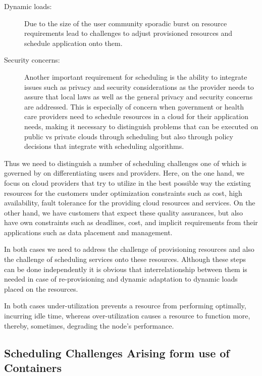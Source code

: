 \documentclass[final,5p,times,twocolumn]{elsarticle}
\begin{document}
\begin{description}
\item[Dynamic loads:] Due to the size of the user community sporadic
  burst on resource requirements lead to challenges to adjust
  provisioned resources and schedule application onto them.

\item[Security concerns:] Another important requirement for scheduling
  is the ability to integrate issues such as privacy and security
  considerations as the provider needs to assure that local laws as
  well as the general privacy and security concerns are addressed.
  This is especially of concern when government or health care
  providers need to schedule resources in a cloud for their
  application needs, making it necessary to distinguish problems that
  can be executed on public vs private clouds through scheduling but
  also through policy decisions that integrate with scheduling
  algorithms.
  
\end{description}

Thus we need to distinguish a number of scheduling challenges one of
which is governed by on differentiating users and providers. Here, on
the one hand, we focus on cloud providers that try to utilize in the
best possible way the existing resources for the customers under
optimization constraints such as cost, high availability, fault
tolerance for the providing cloud resources and services. On the other
hand, we have customers that expect these quality assurances, but also
have own constraints such as deadlines, cost, and implicit
requirements from their applications such as data placement and
management.

In both cases we need to address the challenge of provisioning
resources and also the challenge of scheduling services onto these
resources. Although these steps can be done independently it is
obvious that interrelationship between them is needed in case of
re-provisioning and dynamic adaptation to dynamic loads placed on the
resources.

In both cases under-utilization prevents a resource from performing
optimally, incurring idle time, whereas over-utilization causes a
resource to function more, thereby, sometimes, degrading the node's
performance.




\subsection{Scheduling Challenges Arising form use of Containers}
\end{document}
